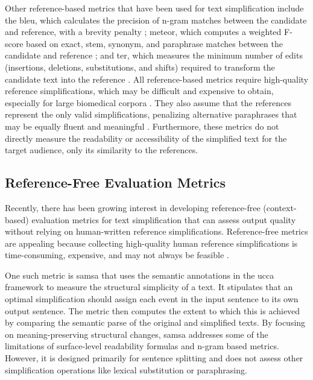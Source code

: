 Other reference-based metrics that have been used for text simplification include the \gls{bleu}, which calculates the precision of n-gram matches between the candidate and reference, with a brevity penalty \cite{papineni-etal-2002-bleu}; \gls{meteor}, which computes a weighted F-score based on exact, stem, synonym, and paraphrase matches between the candidate and reference \cite{banerjee-lavie-2005-meteor}; and \gls{ter}, which measures the minimum number of edits (insertions, deletions, substitutions, and shifts) required to transform the candidate text into the reference \cite{snover-etal-2006-study}.
All reference-based metrics require high-quality reference simplifications, which may be difficult and expensive to obtain, especially for large biomedical corpora \cite{alva-manchego-etal-2021-un}. 
They also assume that the references represent the only valid simplifications, penalizing alternative paraphrases that may be equally fluent and meaningful \cite{sottana2023evaluationmetricseragpt4, huang-kochmar-2024-referee, lyu2024scigispynovelmetricbiomedical}. 
Furthermore, these metrics do not directly measure the readability or accessibility of the simplified text for the target audience, only its similarity to the references.

\subsection{Reference-Free Evaluation Metrics}

Recently, there has been growing interest in developing reference-free (context-based) evaluation metrics for text simplification that can assess output quality without relying on human-written reference simplifications. 
Reference-free metrics are appealing because collecting high-quality human reference simplifications is time-consuming, expensive, and may not always be feasible \cite{alva-manchego-etal-2021-un, 94205144dd7945cc99b5a6544451b668, deutsch-etal-2022-limitations}.

One such metric is \gls{samsa} \cite{sulem-etal-2018-semantic} that uses the semantic annotations in the \gls{ucca} framework to measure the structural simplicity of a text. 
It stipulates that an optimal simplification should assign each event in the input sentence to its own output sentence. 
The metric then computes the extent to which this is achieved by comparing the semantic parse of the original and simplified texts. 
By focusing on meaning-preserving structural changes, \gls{samsa} addresses some of the limitations of surface-level readability formulas and n-gram based metrics. 
However, it is designed primarily for sentence splitting and does not assess other simplification operations like lexical substitution or paraphrasing.

